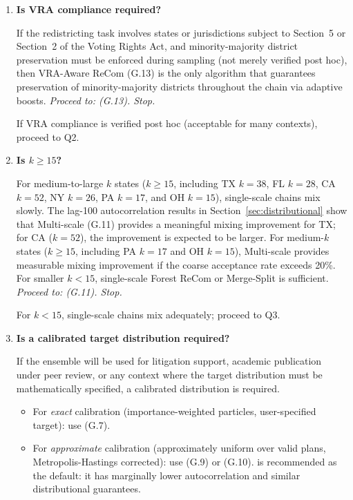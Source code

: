 \begin{enumerate}[label=\textbf{Q\arabic*.}]

  \item \textbf{Is VRA compliance required?}

    If the redistricting task involves states or jurisdictions subject to
    Section~5 or Section~2 of the Voting Rights Act, and minority-majority
    district preservation must be enforced during sampling (not merely
    verified post hoc), then VRA-Aware ReCom (G.13) is the only algorithm
    that guarantees preservation of minority-majority districts
    throughout the chain via adaptive boosts.
    \emph{Proceed to: \vra{} (G.13). Stop.}

    If VRA compliance is verified post hoc (acceptable for many contexts),
    proceed to Q2.

  \item \textbf{Is $k \geq 15$?}

    For medium-to-large $k$ states ($k \geq 15$, including TX $k=38$,
    FL $k=28$, CA $k=52$, NY $k=26$, PA $k=17$, and OH $k=15$),
    single-scale chains mix slowly.
    The lag-100 autocorrelation results in Section~\ref{sec:distributional}
    show that Multi-scale (G.11) provides a meaningful mixing improvement
    for TX; for CA ($k=52$), the improvement is expected to be larger.
    For medium-$k$ states ($k \geq 15$, including PA $k=17$ and OH $k=15$),
    Multi-scale provides measurable mixing improvement if the coarse
    acceptance rate exceeds 20\%.
    For smaller $k < 15$, single-scale Forest ReCom or Merge-Split is
    sufficient.
    \emph{Proceed to: \ms{} (G.11). Stop.}

    For $k < 15$, single-scale chains mix adequately; proceed to Q3.

  \item \textbf{Is a calibrated target distribution required?}

    If the ensemble will be used for litigation support, academic
    publication under peer review, or any context where the target
    distribution must be mathematically specified, a calibrated distribution
    is required.

    \begin{itemize}
      \item For \emph{exact} calibration (importance-weighted particles,
            user-specified target): use \smc{} (G.7).
      \item For \emph{approximate} calibration (approximately uniform over
            valid plans, Metropolis-Hastings corrected): use \fr{} (G.9)
            or \msp{} (G.10).
            \msp{} is recommended as the default: it has marginally lower
            autocorrelation and similar distributional guarantees.
    \end{itemize}


\end{enumerate}
